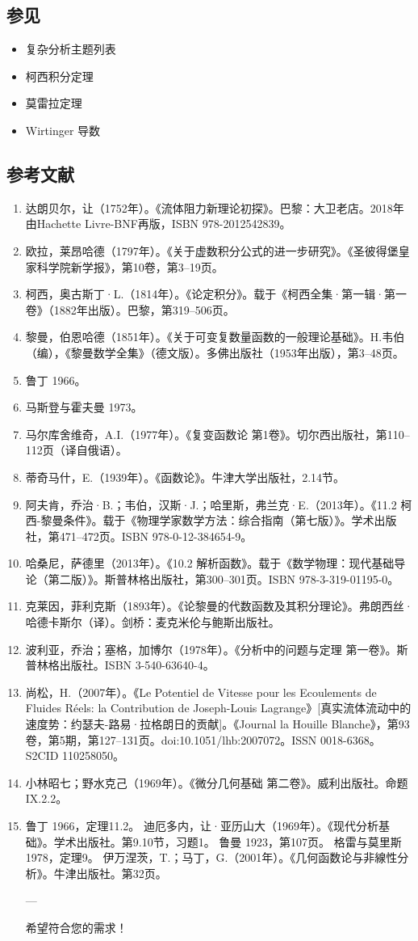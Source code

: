 \subsection{参见}  
\begin{itemize}
\item 复杂分析主题列表  
\item 柯西积分定理  
\item 莫雷拉定理  
\item Wirtinger 导数
\end{itemize}
\subsection{参考文献}
\begin{enumerate}
\item 达朗贝尔，让（1752年）。《流体阻力新理论初探》。巴黎：大卫老店。2018年由Hachette Livre-BNF再版，ISBN 978-2012542839。
\item 欧拉，莱昂哈德（1797年）。《关于虚数积分公式的进一步研究》。《圣彼得堡皇家科学院新学报》，第10卷，第3–19页。
\item 柯西，奥古斯丁·L.（1814年）。《论定积分》。载于《柯西全集·第一辑·第一卷》（1882年出版）。巴黎，第319–506页。
\item 黎曼，伯恩哈德（1851年）。《关于可变复数量函数的一般理论基础》。H.韦伯（编），《黎曼数学全集》（德文版）。多佛出版社（1953年出版），第3–48页。
\item 鲁丁 1966。
\item 马斯登与霍夫曼 1973。
\item 马尔库舍维奇，A.I.（1977年）。《复变函数论 第1卷》。切尔西出版社，第110–112页（译自俄语）。
\item 蒂奇马什，E.（1939年）。《函数论》。牛津大学出版社，2.14节。
\item 阿夫肯，乔治·B.；韦伯，汉斯·J.；哈里斯，弗兰克·E.（2013年）。《11.2 柯西-黎曼条件》。载于《物理学家数学方法：综合指南（第七版）》。学术出版社，第471–472页。ISBN 978-0-12-384654-9。
\item 哈桑尼，萨德里（2013年）。《10.2 解析函数》。载于《数学物理：现代基础导论（第二版）》。斯普林格出版社，第300–301页。ISBN 978-3-319-01195-0。  
\item 克莱因，菲利克斯（1893年）。《论黎曼的代数函数及其积分理论》。弗朗西丝·哈德卡斯尔（译）。剑桥：麦克米伦与鲍斯出版社。  
\item 波利亚，乔治；塞格，加博尔（1978年）。《分析中的问题与定理 第一卷》。斯普林格出版社。ISBN 3-540-63640-4。  
\item 尚松，H.（2007年）。《Le Potentiel de Vitesse pour les Ecoulements de Fluides Réels: la Contribution de Joseph-Louis Lagrange》[真实流体流动中的速度势：约瑟夫-路易·拉格朗日的贡献]。《Journal la Houille Blanche》，第93卷，第5期，第127–131页。doi:10.1051/lhb:2007072。ISSN 0018-6368。S2CID 110258050。  
\item 小林昭七；野水克己（1969年）。《微分几何基础 第二卷》。威利出版社。命题IX.2.2。  
\item 鲁丁 1966，定理11.2。  
迪厄多内，让·亚历山大（1969年）。《现代分析基础》。学术出版社。第9.10节，习题1。  
鲁曼 1923，第107页。  
格雷与莫里斯 1978，定理9。  
伊万涅茨，T.；马丁，G.（2001年）。《几何函数论与非線性分析》。牛津出版社。第32页。  

--- 

希望符合您的需求！
\end{enumerate}